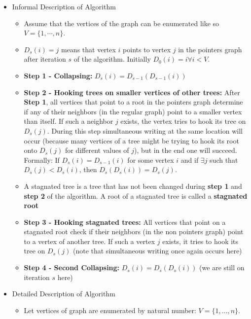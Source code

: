 \documentclass[a4paper]{article}
\begin{document}
\begin{itemize}
\begin{itemize}
\end{itemize}

\item Informal Description of Algorithm
\begin{itemize}
\item Assume that the vertices of the graph can be enumerated like so $V = \{1, \cdots, n\}$. 

\item $D_s(i) = j$ means that vertex $i$ points to vertex $j$ in the pointers graph after iteration $s$ of the algorithm. Initially $D_0(i) = i \forall i < V$.

\item \textbf{Step 1 - Collapsing:} $D_s(i) = D_{s-1}(D_{s-1}(i))$

\item \textbf{Step 2 - Hooking trees on smaller vertices of other trees:} After \textbf{Step 1}, all vertices that point to a root in the pointers graph determine if any of their neighbors (in the regular graph) point to a smaller vertex than itself. If such a neighbor $j$ exists, the vertex tries to hook its tree on $D_s(j)$. During this step simultaneous writing at the same location will occur (because many vertices of a tree might be trying to hook its root onto $D_s(j)$ for different values of $j$), but in the end one will succeed. Formally: If $D_s(i) = D_{s-1}(i)$ for some vertex $i$ and if $\exists j$ such that $D_s(j) < D_s(i)$, then $D_s(D_s(i)) = D_s(j)$.

\item A stagnated tree is a tree that has not been changed during \textbf{step 1} and \textbf{step 2} of the algorithm. A root of a stagnated tree is called a \textbf{stagnated root}

\item \textbf{Step 3 - Hooking stagnated trees:} All vertices that point on a stagnated root check if their neighbors (in the non pointers graph) point to a vertex of another tree. If such a vertex $j$ exists, it tries to hook its tree on $D_s(j)$ (note that simultaneous writing once again occurs here)

\item \textbf{Step 4 - Second Collapsing:} $D_s(i) = D_s(D_s(i))$ (we are still on iteration $s$ here)
 
\end{itemize}

\item Detailed Description of Algorithm
\begin{itemize}
\item Let vertices of graph are enumerated by natural number: $V = \{1, \ldots, n\}$.


\end{itemize}
\end{itemize}
\end{document}
